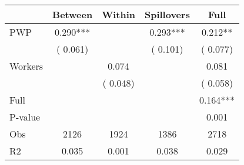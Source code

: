 
\begin{tabular}{l*{4}{c}}\hline&\multicolumn{1}{c}{Between}&\multicolumn{1}{c}{Within}&\multicolumn{1}{c}{Spillovers}&\multicolumn{1}{c}{Full}\\ \hline
 PWP           &              0.290***      &                                               &        0.293*** &         0.212**                            \\ 
                               &        (       0.061)           &                                       &       (       0.101)     &      (       0.077)                                           \\ 
 Workers       &                                               &        0.074    &                                &             0.081                            \\ 
                               &                                               & (       0.048)                  &                                        &      (       0.058)                                           \\ 
\hline                                                                                                                                                                                                                                            
 Full                  &                                               &                                               &                                        &             0.164***                                     \\ 
 P-value               &                                               &                                               &                                        &             0.001                                           \\ 
 Obs                   &               2126               &       1924                       &       1386                &              2718                                               \\ 
 R2                    &                      0.035              &              0.001                      &              0.038               &                     0.029                                              \\ 
\hline \end{tabular}                                                                                                                                                                                                              